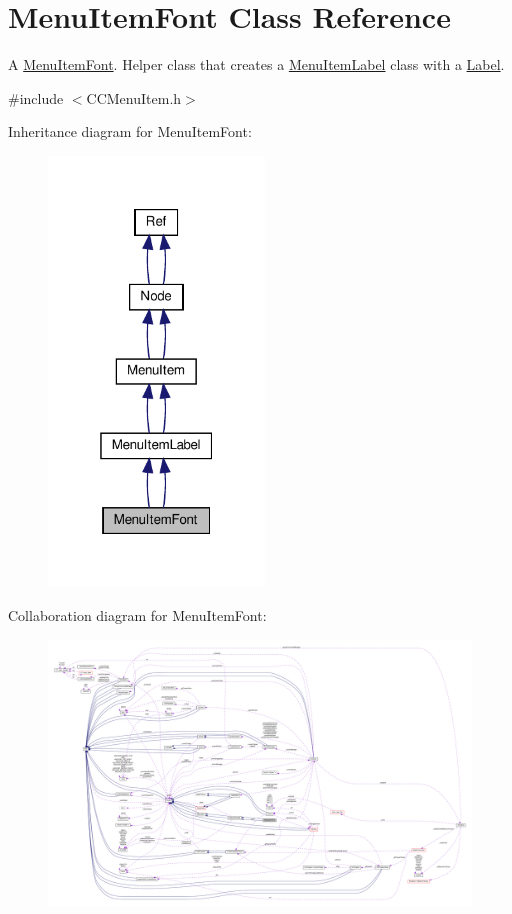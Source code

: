 \hypertarget{classMenuItemFont}{}\section{Menu\+Item\+Font Class Reference}
\label{classMenuItemFont}


A \hyperlink{classMenuItemFont}{Menu\+Item\+Font}. Helper class that creates a \hyperlink{classMenuItemLabel}{Menu\+Item\+Label} class with a \hyperlink{classLabel}{Label}.  




{\ttfamily \#include $<$C\+C\+Menu\+Item.\+h$>$}



Inheritance diagram for Menu\+Item\+Font\+:
\nopagebreak
\begin{figure}[H]
\begin{center}
\leavevmode
\includegraphics[width=163pt]{classMenuItemFont__inherit__graph}
\end{center}
\end{figure}


Collaboration diagram for Menu\+Item\+Font\+:
\nopagebreak
\begin{figure}[H]
\begin{center}
\leavevmode
\includegraphics[width=350pt]{classMenuItemFont__coll__graph}
\end{center}
\end{figure}
